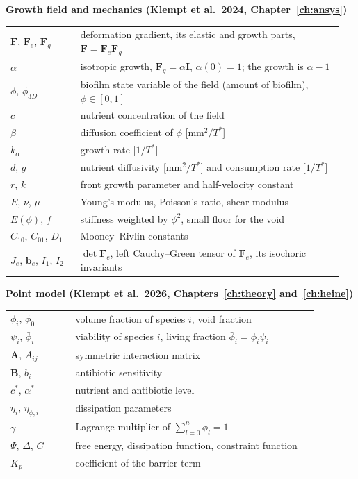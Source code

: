 \documentclass[12pt, a4paper, twoside]{report}
\begin{document}
\medskip\noindent\textbf{Growth field and mechanics (Klempt et al.\ 2024, Chapter~\ref{ch:ansys})}\\[2pt]
\begin{tabular}{@{}p{0.2\linewidth}p{0.75\linewidth}@{}}
$\mathbf F$, $\mathbf F_e$, $\mathbf F_g$ & deformation gradient, its elastic and growth parts, $\mathbf F=\mathbf F_e\mathbf F_g$\\
$\alpha$ & isotropic growth, $\mathbf F_g=\alpha\mathbf I$, $\alpha(0)=1$; the growth is $\alpha-1$\\
$\phi$, $\phi_{3D}$ & biofilm state variable of the field (amount of biofilm), $\phi\in[0,1]$\\
$c$ & nutrient concentration of the field\\
$\beta$ & diffusion coefficient of $\phi$ [mm$^2/T^*$]\\
$k_\alpha$ & growth rate [$1/T^*$]\\
$d$, $g$ & nutrient diffusivity [mm$^2/T^*$] and consumption rate [$1/T^*$]\\
$r$, $k$ & front growth parameter and half-velocity constant\\
$E$, $\nu$, $\mu$ & Young's modulus, Poisson's ratio, shear modulus\\
$E(\phi)$, $f$ & stiffness weighted by $\phi^2$, small floor for the void\\
$C_{10}$, $C_{01}$, $D_1$ & Mooney--Rivlin constants\\
$J_e$, $\mathbf b_e$, $\bar I_1$, $\bar I_2$ & $\det\mathbf F_e$, left Cauchy--Green tensor of $\mathbf F_e$, its isochoric invariants\\
\end{tabular}

\medskip\noindent\textbf{Point model (Klempt et al.\ 2026, Chapters~\ref{ch:theory} and~\ref{ch:heine})}\\[2pt]
\begin{tabular}{@{}p{0.2\linewidth}p{0.75\linewidth}@{}}
$\phi_i$, $\phi_0$ & volume fraction of species $i$, void fraction\\
$\psi_i$, $\bar\phi_i$ & viability of species $i$, living fraction $\bar\phi_i=\phi_i\psi_i$\\
$\mathbf A$, $A_{ij}$ & symmetric interaction matrix\\
$\mathbf B$, $b_i$ & antibiotic sensitivity\\
$c^*$, $\alpha^*$ & nutrient and antibiotic level\\
$\eta_i$, $\eta_{\phi,i}$ & dissipation parameters\\
$\gamma$ & Lagrange multiplier of $\sum_{l=0}^{n}\phi_l=1$\\
$\Psi$, $\Delta$, $C$ & free energy, dissipation function, constraint function\\
$K_p$ & coefficient of the barrier term\\
\end{tabular}
\end{document}
